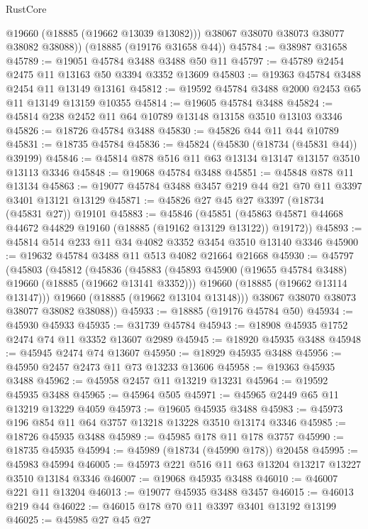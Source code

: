\begin{lexlean}{RustCore}
\begin{coremodule}
          @19660
          (@18885 (@19662 @13039 @13082)))
        @38067
        @38070
        @38073
        @38077
        @38082
        @38088))
    (@18885 (@19176 @31658 @44))
@45784 := @38987 @31658
@45789 := @19051 @45784 @3488 @3488 @50 @11
@45797 := @45789 @2454 @2475 @11 @13163 @50 @3394 @3352 @13609
@45803 := @19363 @45784 @3488 @2454 @11 @13149 @13161
@45812 := @19592 @45784 @3488 @2000 @2453 @65 @11 @13149 @13159 @10355
@45814 := @19605 @45784 @3488
@45824 := @45814 @238 @2452 @11 @64 @10789 @13148 @13158 @3510 @13103 @3346
@45826 := @18726 @45784 @3488
@45830 := @45826 @44 @11 @44 @10789
@45831 := @18735 @45784
@45836 := @45824 (@45830 (@18734 (@45831 @44)) @39199)
@45846 := @45814 @878 @516 @11 @63 @13134 @13147 @13157 @3510 @13113 @3346
@45848 := @19068 @45784 @3488
@45851 := @45848 @878 @11 @13134
@45863 := @19077 @45784 @3488 @3457 @219 @44 @21 @70 @11 @3397 @3401 @13121 @13129
@45871 := @45826 @27 @45 @27 @3397 (@18734 (@45831 @27)) @19101
@45883 := @45846
    (@45851 (@45863 @45871 @44668 @44672 @44829 @19160 (@18885 (@19162 @13129 @13122)) @19172))
@45893 := @45814 @514 @233 @11 @34 @4082 @3352 @3454 @3510 @13140 @3346
@45900 := @19632 @45784 @3488 @11 @513 @4082 @21664 @21668
@45930 := @45797
    (@45803
      (@45812
        (@45836
          (@45883
            (@45893 @45900 (@19655 @45784 @3488) @19660 (@18885 (@19662 @13141 @3352)))
            @19660
            (@18885 (@19662 @13114 @13147)))
          @19660
          (@18885 (@19662 @13104 @13148)))
        @38067
        @38070
        @38073
        @38077
        @38082
        @38088))
@45933 := @18885 (@19176 @45784 @50)
@45934 := @45930 @45933
@45935 := @31739 @45784
@45943 := @18908 @45935 @1752 @2474 @74 @11 @3352 @13607 @2989
@45945 := @18920 @45935 @3488
@45948 := @45945 @2474 @74 @13607
@45950 := @18929 @45935 @3488
@45956 := @45950 @2457 @2473 @11 @73 @13233 @13606
@45958 := @19363 @45935 @3488
@45962 := @45958 @2457 @11 @13219 @13231
@45964 := @19592 @45935 @3488
@45965 := @45964 @505
@45971 := @45965 @2449 @65 @11 @13219 @13229 @4059
@45973 := @19605 @45935 @3488
@45983 := @45973 @196 @854 @11 @64 @3757 @13218 @13228 @3510 @13174 @3346
@45985 := @18726 @45935 @3488
@45989 := @45985 @178 @11 @178 @3757
@45990 := @18735 @45935
@45994 := @45989 (@18734 (@45990 @178)) @20458
@45995 := @45983 @45994
@46005 := @45973 @221 @516 @11 @63 @13204 @13217 @13227 @3510 @13184 @3346
@46007 := @19068 @45935 @3488
@46010 := @46007 @221 @11 @13204
@46013 := @19077 @45935 @3488 @3457
@46015 := @46013 @219 @44
@46022 := @46015 @178 @70 @11 @3397 @3401 @13192 @13199
@46025 := @45985 @27 @45 @27

\end{coremodule}
\end{lexlean}
